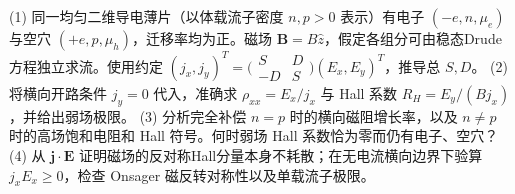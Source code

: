 (1) 同一均匀二维导电薄片（以体载流子密度 \(n,p>0\) 表示）有电子 \((-e,n,\mu_e)\) 与空穴 \((+e,p,\mu_h)\)，迁移率均为正。磁场 \(\mathbf B=B\hat z\)，假定各组分可由稳态Drude方程独立求流。使用约定 \((j_x,j_y)^T=\bigl(\begin{smallmatrix}S&D\\-D&S\end{smallmatrix}\bigr)(E_x,E_y)^T\)，推导总 \(S,D\)。
(2) 将横向开路条件 \(j_y=0\) 代入，准确求 \(\rho_{xx}=E_x/j_x\) 与 Hall 系数 \(R_H=E_y/(Bj_x)\)，并给出弱场极限。
(3) 分析完全补偿 \(n=p\) 时的横向磁阻增长率，以及 \(n\ne p\) 时的高场饱和电阻和 Hall 符号。何时弱场 Hall 系数恰为零而仍有电子、空穴？
(4) 从 \(\mathbf j\cdot\mathbf E\) 证明磁场的反对称Hall分量本身不耗散；在无电流横向边界下验算 \(j_xE_x\ge0\)，检查 Onsager 磁反转对称性以及单载流子极限。
